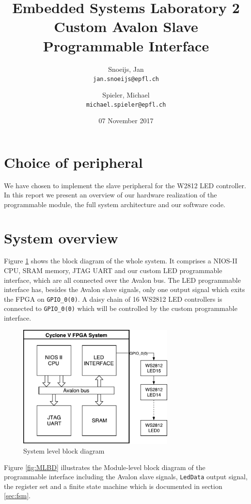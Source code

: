 \documentclass{article}
\title{Embedded Systems Laboratory 2\\
        Custom Avalon Slave Programmable Interface}
\author{
  Snoeijs, Jan\\
    \texttt{jan.snoeijs@epfl.ch}
  \and
  Spieler, Michael\\
  \texttt{michael.spieler@epfl.ch}
}
\date{07 November 2017}
\begin{document}
\maketitle

\section{Choice of peripheral}
We have chosen to implement the slave peripheral for the W2812 LED controller. In this report we present an overview of our hardware realization of the programmable module, the full system architecture and our software code.

\section{System overview}

Figure \ref{fig:SLBD} shows the block diagram of the whole system.
It comprises a NIOS-II CPU, SRAM memory, JTAG UART and our custom LED programmable interface, which are all connected over the Avalon bus.
The LED programmable interface has, besides the Avalon slave signals, only one output signal which exits the FPGA on \verb'GPIO_0(0)'. A daisy chain of 16 WS2812 LED controllers is connected to \verb'GPIO_0(0)' which will be controlled by the custom programmable interface.

\begin{figure}[H]
    \centering
    \includegraphics[width=0.7\textwidth]{system_level_block_diagram}
    \caption{System level block diagram}
    \label{fig:SLBD}
\end{figure}

Figure \ref{fig:MLBD} illustrates the Module-level block diagram of the programmable interface including the Avalon slave signals, \verb'LedData' output signal, the register set and a finite state machine which is documented in section \ref{sec:fsm}.
\end{document}
